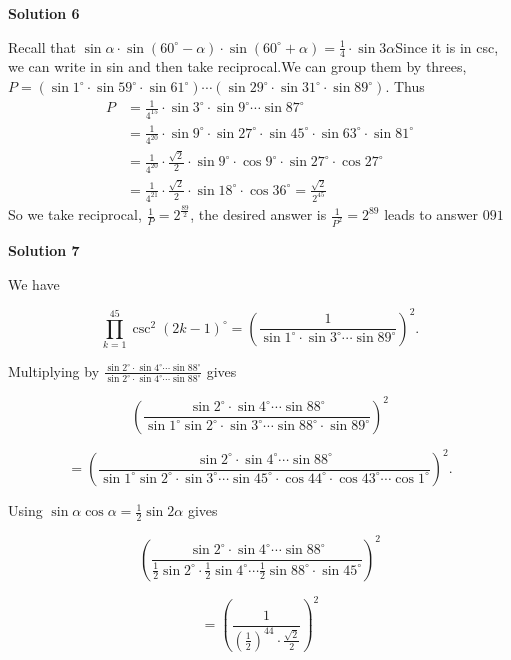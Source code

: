\begin{enumerate}
 



\textbf{Solution 6}

Recall that $\sin\alpha\cdot \sin(60^{\circ}-\alpha)\cdot \sin(60^{\circ}+\alpha)=\frac{1}{4}\cdot \sin3\alpha$Since it is in csc, we can write in sin and then take reciprocal.We can group them by threes, $P=(\sin1^{\circ}\cdot \sin59^{\circ}\cdot \sin61^{\circ})\cdots(\sin29^{\circ}\cdot \sin31^{\circ}\cdot \sin89^{\circ})$. Thus
 \begin{align*} P &=\frac{1}{4^{15}}\cdot \sin3^{\circ}\cdot \sin9^{\circ}\cdots\sin87^{\circ}\\ &=\frac{1}{4^{20}}\cdot \sin9^{\circ}\cdot \sin27^{\circ}\cdot \sin45^{\circ}\cdot \sin63^{\circ}\cdot \sin81^{\circ}\\ &=\frac{1}{4^{20}}\cdot \frac{\sqrt{2}}{2}\cdot \sin9^{\circ}\cdot \cos9^{\circ}\cdot \sin27^{\circ}\cdot \cos27^{\circ}\\ &=\frac{1}{4^{21}}\cdot \frac{\sqrt{2}}{2}\cdot \sin18^{\circ}\cdot \cos36^{\circ}=\frac{\sqrt{2}}{2^{45}} \end{align*}
So we take reciprocal, $\frac 1P=2^{\frac{89}{2}}$, the desired answer is $\frac{1}{P^2}=2^{89}$ leads to answer $\boxed{091}$




\textbf{Solution 7}

We have

 
 \[\prod_{k=1}^{45} \csc^2(2k-1)^\circ = \left(\frac{1}{\sin1^\circ \cdot \sin3^\circ \cdots \sin89^\circ}\right)^2.\]

 Multiplying by $\frac{\sin2^\circ \cdot \sin4^\circ \cdots \sin88^\circ}{\sin2^\circ \cdot \sin4^\circ \cdots \sin88^\circ}$ gives

 
 \[\left(\frac{\sin2^\circ \cdot \sin4^\circ \cdots \sin88^\circ}{\sin1^\circ \sin2^\circ \cdot \sin3^\circ \cdots \sin88^\circ \cdot \sin89^\circ}\right)^2\]

 \[= \left(\frac{\sin2^\circ \cdot \sin4^\circ \cdots \sin88^\circ}{\sin1^\circ \sin2^\circ \cdot \sin3^\circ \cdots \sin 45^\circ \cdot \cos 44^\circ \cdot \cos 43^\circ \cdots \cos1^\circ}\right)^2.\]

 Using $\sin\alpha \cos\alpha = \frac{1}{2}\sin{2\alpha}$ gives

 
 \[\left(\frac{\sin2^\circ \cdot \sin4^\circ \cdots \sin88^\circ}{\frac{1}{2} \sin2^\circ \cdot \frac{1}{2} \sin4^\circ \cdots \frac{1}{2} \sin88^\circ \cdot \sin45^\circ}\right) ^2\]

 \[= \left(\frac{1}{(\frac{1}{2})^{44} \cdot \frac{\sqrt{2}}{2}}\right)^2\]


\end{enumerate}
